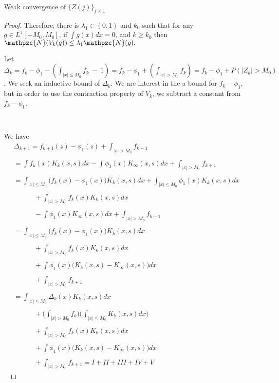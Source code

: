 \documentclass[12pt]{article}
\begin{document}
\begin{section}{Weak convergence of $\{Z(j)\}_{j \ge 1}$ }
\begin{proof}
Therefore, there is $\lambda_1 \in (0,1)$ and $k_0$ such that for any $g \in L^1[-M_0,M_0]$, if $\int g(x)dx = 0$, and $k \ge k_0$ then $\mathpzc{N}(V_k(g)) \le \lambda_1 \mathpzc{N}(g).$ 

Let $\Delta_k =  f_k - \phi_1 - (\int_{|x| \le M_0} f_k \ - \ 1)  = 
f_k - \phi_1 + (\int_{|x| > M_0} f_k) = f_k - \phi_1 + P(|Z_k| > M_0) $. We seek an inductive bound of $\Delta_{k}$. We are interest in the a bound for $f_k - \phi_1$, but in order to use the contraction property of $V_k$, we subtract a constant from $f_k - \phi_1$.  

\  

We have
\begingroup
\allowdisplaybreaks
\begin{align*}
&\Delta_{k+1} = f_{k+1}(z) - \phi_1(z) + \int_{|x| > M_0} f_{k+1}  &\\
&\ &\\
&= \int f_k(x) K_k(x,s) dx - \int \phi_1(x) K_{\infty}(x,s) dx + \int_{|x| > M_0} f_{k+1} &\\
&\ &\\
&= \int_{|x| \le M_0} \big(f_k(x) - \phi_1(x) \big) K_k(x,s) dx + \int_{|x| \le M_0} \phi_1(x) K_k(x,s) dx &\\
&\ &\\
&\quad \quad \quad +  \int_{|x| > M_0} f_k(x)  K_k(x,s) dx &\\
&\ &\\
&\quad \quad \quad - \int \phi_1(x) K_{\infty}(x,s) dx  + \int_{|x| > M_0} f_{k+1} &\\
&\ &\\
& = \int_{|x| \le M_0} \big(f_k(x) - \phi_1(x) \big) K_k(x,s) dx  &\\
&\ &\\
&\quad \quad \quad+  \int_{|x| > M_0} f_k(x)  K_k(x,s) dx &\\
&\ &\\
&\quad \quad \quad+ \int \phi_1(x) \big( K_k(x,s) - K_{\infty}(x,s) \big) dx &\\
&\ &\\
&\quad \quad \quad+ \int_{|x| > M_0} f_{k+1} &\\
&\ &\\
& = \int_{|x| \le M_0} \Delta_k(x) K_k(x,s) dx  &\\
&\ &\\
&\quad \quad \quad+  \big( \int_{|x| > M_0} f_{k} \big) \big( \int_{|x| \le M_0} K_k(x,s) dx \big) &\\
&\ &\\
&\quad \quad \quad+  \int_{|x| > M_0} f_k(x)  K_k(x,s) dx &\\
&\ &\\
&\quad \quad \quad+ \int \phi_1(x) \big( K_k(x,s) - K_{\infty}(x,s) \big) dx &\\
&\ &\\
&\quad \quad \quad+ \int_{|x| > M_0} f_{k+1} = I + II + III + IV + V &
\end{align*}
\endgroup
\  


\end{proof}
\end{section}
\end{document}
